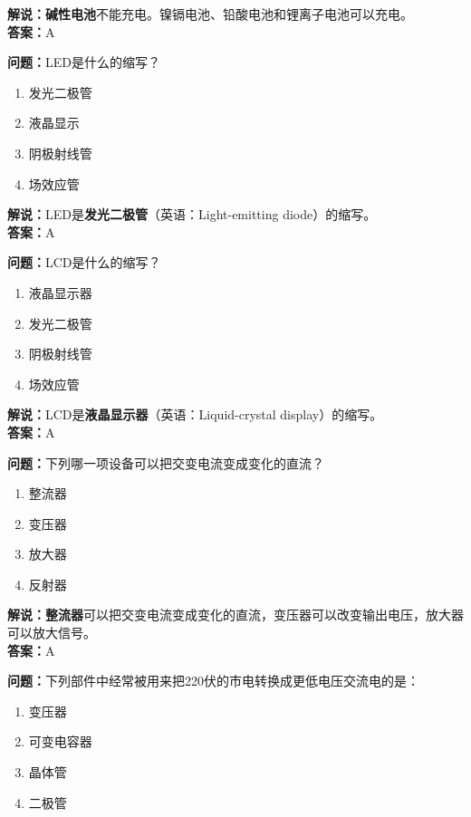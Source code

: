 \textbf{解说：碱性电池}不能充电。镍镉电池、铅酸电池和锂离子电池可以充电。\\\textbf{答案：}A

\textbf{问题：}LED是什么的缩写？

\begin{enumerate}[label=\Alph*), leftmargin=1cm]
	\item 发光二极管
	\item 液晶显示
	\item 阴极射线管
	\item 场效应管
\end{enumerate}

\textbf{解说：}LED是\textbf{发光二极管}（英语：Light-emitting diode）的缩写。\\\textbf{答案：}A%


\textbf{问题：}LCD是什么的缩写？

\begin{enumerate}[label=\Alph*), leftmargin=1cm]
	\item 液晶显示器
	\item 发光二极管
	\item 阴极射线管
	\item 场效应管
\end{enumerate}

\textbf{解说：}LCD是\textbf{液晶显示器}（英语：Liquid-crystal display）的缩写。\\\textbf{答案：}A%


\textbf{问题：}下列哪一项设备可以把交变电流变成变化的直流？

\begin{enumerate}[label=\Alph*), leftmargin=1cm]
	\item 整流器
	\item 变压器
	\item 放大器
	\item 反射器
\end{enumerate}

\textbf{解说：整流器}可以把交变电流变成变化的直流，变压器可以改变输出电压，放大器可以放大信号。\\\textbf{答案：}A%



\textbf{问题：}下列部件中经常被用来把220伏的市电转换成更低电压交流电的是：

\begin{enumerate}[label=\Alph*), leftmargin=1cm]
	\item 变压器
	\item 可变电容器
	\item 晶体管
	\item 二极管
\end{enumerate}

